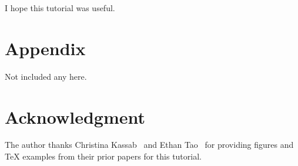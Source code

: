 \documentclass[letterpaper, 10 pt, conference]{ieeeconf}  %
\begin{document}
I hope this tutorial was useful.


\section*{Appendix}

Not included any here.

\section*{Acknowledgment}

The author thanks Christina Kassab~\cite{kassab2025ol3d} and Ethan Tao~\cite{tao2022pdc} for providing figures and TeX examples from their prior papers for this tutorial.



\balance



\end{document}
